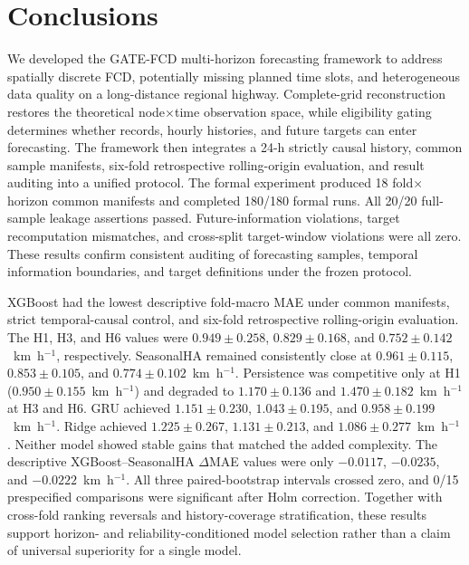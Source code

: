 \documentclass[pdflatex,sn-mathphys-num,iicol]{sn-jnl}
\begin{document}
\section{Conclusions}
\label{sec:conclusions}

We developed the GATE-FCD multi-horizon forecasting framework to address spatially discrete FCD, potentially missing planned time slots, and heterogeneous data quality on a long-distance regional highway. Complete-grid reconstruction restores the theoretical node$\times$time observation space, while eligibility gating determines whether records, hourly histories, and future targets can enter forecasting. The framework then integrates a 24-h strictly causal history, common sample manifests, six-fold retrospective rolling-origin evaluation, and result auditing into a unified protocol. The formal experiment produced 18 fold$\times$horizon common manifests and completed 180/180 formal runs. All 20/20 full-sample leakage assertions passed. Future-information violations, target recomputation mismatches, and cross-split target-window violations were all zero. These results confirm consistent auditing of forecasting samples, temporal information boundaries, and target definitions under the frozen protocol.

XGBoost had the lowest descriptive fold-macro MAE under common manifests, strict temporal-causal control, and six-fold retrospective rolling-origin evaluation. The H1, H3, and H6 values were $0.949 \pm 0.258$, $0.829 \pm 0.168$, and $0.752 \pm 0.142$~km~h$^{-1}$, respectively. SeasonalHA remained consistently close at $0.961 \pm 0.115$, $0.853 \pm 0.105$, and $0.774 \pm 0.102$~km~h$^{-1}$. Persistence was competitive only at H1 ($0.950 \pm 0.155$~km~h$^{-1}$) and degraded to $1.170 \pm 0.136$ and $1.470 \pm 0.182$~km~h$^{-1}$ at H3 and H6. GRU achieved $1.151 \pm 0.230$, $1.043 \pm 0.195$, and $0.958 \pm 0.199$~km~h$^{-1}$. Ridge achieved $1.225 \pm 0.267$, $1.131 \pm 0.213$, and $1.086 \pm 0.277$~km~h$^{-1}$. Neither model showed stable gains that matched the added complexity. The descriptive XGBoost--SeasonalHA $\Delta$MAE values were only $-0.0117$, $-0.0235$, and $-0.0222$~km~h$^{-1}$. All three paired-bootstrap intervals crossed zero, and 0/15 prespecified comparisons were significant after Holm correction. Together with cross-fold ranking reversals and history-coverage stratification, these results support horizon- and reliability-conditioned model selection rather than a claim of universal superiority for a single model.
\end{document}
